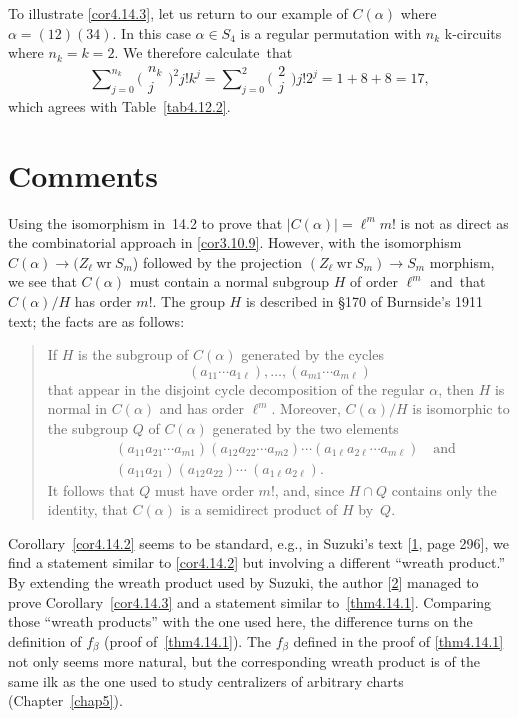 \documentclass{surv-l}
\numberwithin{equation}{section}
\numberwithin{table}{section}
\numberwithin{figure}{section}
\theoremstyle{definition}
\begin{document}
To illustrate \ref{cor4.14.3}, let us return to our example of
$C(\alpha)$ where $\alpha=(12)(34)$. In this case $\alpha\in
S_{4}$ is a regular permutation with $n_{k}$ k-circuits where
$n_{k}= k=2$. We therefore calculate~that
\[
\sum\nolimits_{j=0}^{n_{k}} \big(\begin{smallmatrix}
n_{k}\\
j\end{smallmatrix}\big)^2 j!k^{j} = \sum\nolimits_{j=0}^{2} \big(\begin{smallmatrix}
2\\
j\end{smallmatrix}\big)j!2^{j}=1+8+8=17,
\]
which agrees with Table~\ref{tab4.12.2}.

\section{Comments}\label{sec4.15}

Using the isomorphism in~14.2 to prove that
$|C(\alpha)|=\ell^{m}m!$ is not as direct as the combinatorial
approach in \ref{cor3.10.9}. However, with the isomorphism
$C(\alpha)\rightarrow(Z_{\ell}\ \mathrm{wr}\ S_{m}$) followed by
the projection $(Z_{\ell}\ \mathrm{wr}\ S_{m})\rightarrow S_{m}$
morphism, we see that $C(\alpha)$ must contain a normal subgroup
$H$ of order $\ell^m$ and~that $C(\alpha)/H$ has order $m!$. The
group $H$ is described in \S170 of Burnside's 1911 text; the facts
are as follows:
\begin{quote}
If $H$ is the subgroup of $C(\alpha)$ generated by the cycles
\[
(a_{11}\cdots a_{1\ell}),\ldots, (a_{m1}\cdots a_{m\ell})
\]
that appear in the disjoint cycle decomposition of the regular
$\alpha$, then $H$ is normal in $C(\alpha)$ and has order
$\ell^{m}$. Moreover, $C(\alpha)/H$ is isomorphic to the subgroup
$Q$ of $C(\alpha)$ generated by the two elements
\begin{align*}
&(a_{11}a_{21}\cdots a_{m1})(a_{12}a_{22}\cdots
a_{m2})\cdots(a_{1\ell}a_{2\ell}\cdots a_{m\ell})\quad \mathrm{and} \\
&(a_{11}a_{21})(a_{12}a_{22})\cdots\ (a_{1\ell}a_{2\ell}).
\end{align*}
It follows that $Q$ must have order $m!$, and, since $H\cap Q$
contains only the identity, that $C(\alpha)$ is a semidirect
product of $H$ by~$Q$.
\end{quote}

Corollary~\ref{cor4.14.2} seems to be standard, e.g., in
Suzuki's text [\hyperlink{bib74}{1}, page
296], we find a statement similar to \ref{cor4.14.2} but
involving a different ``wreath product.'' By
extending the wreath product used by Suzuki, the
author [\hyperlink{bib74a}{2}] managed to prove
Corollary~\ref{cor4.14.3} and a statement similar
to~\ref{thm4.14.1}. Comparing those ``wreath products'' with the
one used here, the difference turns on the definition of
$f_{\beta}$ (proof of~\ref{thm4.14.1}). The $f_{\beta}$ defined in
the proof of \ref{thm4.14.1} not only seems more natural, but the
corresponding wreath product is of the same ilk as the one used to
study centralizers of arbitrary charts (Chapter~\ref{chap5}).
\end{document}

